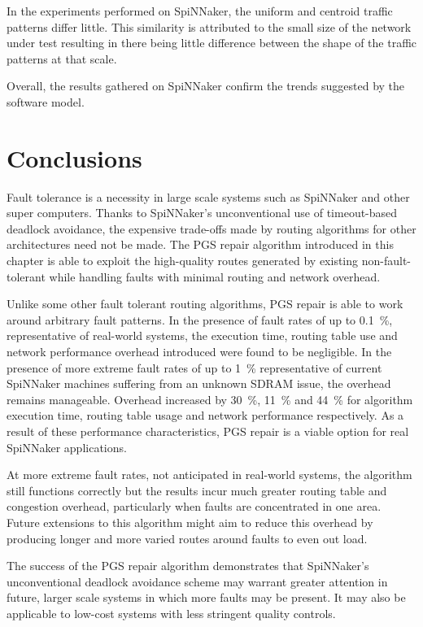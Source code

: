 				In the experiments performed on SpiNNaker, the uniform and centroid
				traffic patterns differ little. This similarity is attributed to the
				small size of the network under test resulting in there being little
				difference between the shape of the traffic patterns at that scale.
				
				Overall, the results gathered on SpiNNaker confirm the trends suggested
				by the software model.
		
	\section{Conclusions}
		
		Fault tolerance is a necessity in large scale systems such as SpiNNaker and
		other super computers. Thanks to SpiNNaker's unconventional use of
		timeout-based deadlock avoidance, the expensive trade-offs made by routing
		algorithms for other architectures need not be made. The PGS repair
		algorithm introduced in this chapter is able to exploit the high-quality
		routes generated by existing non-fault-tolerant while handling faults with
		minimal routing and network overhead.
		
		Unlike some other fault tolerant routing algorithms, PGS repair is able to
		work around arbitrary fault patterns.  In the presence of fault rates of up
		to \SI{0.1}{\percent}, representative of real-world systems, the execution
		time, routing table use and network performance overhead introduced were
		found to be negligible.  In the presence of more extreme fault rates of up
		to \SI{1}{\percent} representative of current SpiNNaker machines suffering
		from an unknown SDRAM issue, the overhead remains manageable. Overhead
		increased by \SI{30}{\percent}, \SI{11}{\percent} and \SI{44}{\percent} for
		algorithm execution time, routing table usage and network performance
		respectively.  As a result of these performance characteristics, PGS repair
		is a viable option for real SpiNNaker applications.
		
		At more extreme fault rates, not anticipated in real-world systems, the
		algorithm still functions correctly but the results incur much greater
		routing table and congestion overhead, particularly when faults are
		concentrated in one area. Future extensions to this algorithm might aim to
		reduce this overhead by producing longer and more varied routes around
		faults to even out load.
		
		The success of the PGS repair algorithm demonstrates that SpiNNaker's
		unconventional deadlock avoidance scheme may warrant greater attention in
		future, larger scale systems in which more faults may be present. It may
		also be applicable to low-cost systems with less stringent quality
		controls.

